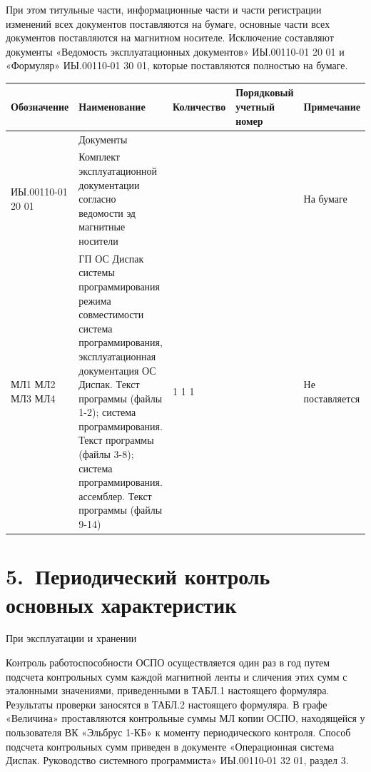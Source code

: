 \documentclass[11pt,a4paper]{article}
\begin{document}
При этом титульные части, информационные части и части регистрации изменений всех документов поставляются на бумаге, основные части всех документов поставляются на магнитном носителе. Исключение составляют документы «Ведомость эксплуатационных документов» ИЫ.00110-01 20 01 и «Формуляр» ИЫ.00110-01 30 01, которые поставляются полностью на бумаге.

\begin{center}\small\begin{tabularx}{\linewidth}{|>{\raggedright\arraybackslash\hsize=1.418\hsize}X|>{\raggedright\arraybackslash\hsize=1.269\hsize}X|>{\raggedright\arraybackslash\hsize=0.522\hsize}X|>{\raggedright\arraybackslash\hsize=0.821\hsize}X|>{\raggedright\arraybackslash\hsize=0.970\hsize}X|}\hline
\small\bfseries\hspace{0pt}Обозначение & \small\bfseries\hspace{0pt}Наименование & \small\bfseries\hspace{0pt}Количество & \small\bfseries\hspace{0pt}Порядковый учетный номер & \small\bfseries\hspace{0pt}Примечание \\ \hline
 & Документы &  &  &  \\ \hline
ИЫ.00110-01 20 01 & Комплект эксплуатационной документации согласно ведомости эд магнитные носители & 1 &  & На бумаге \\ \hline
МЛ1 МЛ2 МЛ3 МЛ4 & ГП ОС Диспак системы программирования режима совместимости система программирования, эксплуатационная документация ОС Диспак. Текст программы (файлы 1-2); система программирования. Текст программы (файлы 3-8); система программирования. ассемблер. Текст программы (файлы 9-14) & 1 1 1 1 &  & Не поставляется \\ \hline
\end{tabularx}\end{center}

\section*{5.~Периодический контроль основных характеристик}
\begin{center}При эксплуатации и хранении\end{center}
Контроль работоспособности ОСПО осуществляется один раз в год путем подсчета контрольных сумм каждой магнитной ленты и сличения этих сумм с эталонными значениями, приведенными в ТАБЛ.1 настоящего формуляра. Результаты проверки заносятся в ТАБЛ.2 настоящего формуляра. В графе «Величина» проставляются контрольные суммы МЛ копии ОСПО, находящейся у пользователя ВК «Эльбрус 1-КБ» к моменту периодического контроля. Способ подсчета контрольных сумм приведен в документе «Операционная система Диспак. Руководство системного программиста» ИЫ.00110-01 32 01, раздел 3.
\end{document}
